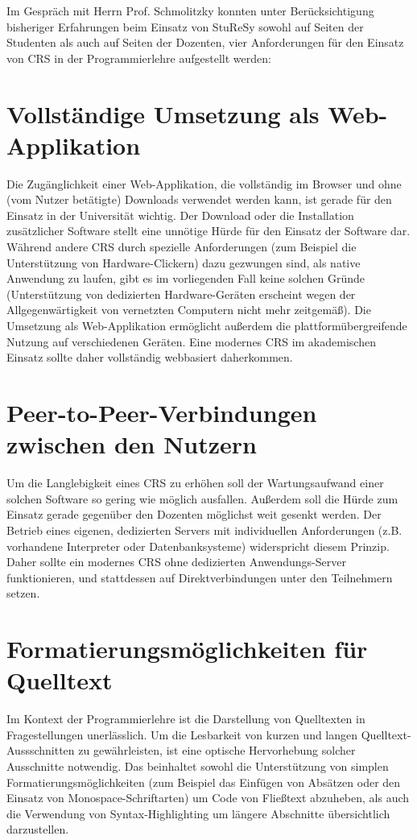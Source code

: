 Im Gespräch mit Herrn Prof. Schmolitzky konnten unter Berücksichtigung bisheriger Erfahrungen beim Einsatz von StuReSy sowohl auf Seiten der Studenten als auch auf Seiten der Dozenten, vier Anforderungen für den Einsatz von CRS in der Programmierlehre aufgestellt werden:

\section{Vollständige Umsetzung als Web-Applikation}
\label{chap:webbasiert}
Die Zugänglichkeit einer Web-Applikation, die vollständig im Browser und ohne (vom Nutzer betätigte) Downloads verwendet werden kann, ist gerade für den Einsatz in der Universität wichtig. Der Download oder die Installation zusätzlicher Software stellt eine unnötige Hürde für den Einsatz der Software dar. Während andere CRS durch spezielle Anforderungen (zum Beispiel die Unterstützung von Hardware-Clickern) dazu gezwungen sind, als native Anwendung zu laufen, gibt es im vorliegenden Fall keine solchen Gründe (Unterstützung von dedizierten Hardware-Geräten erscheint wegen der Allgegenwärtigkeit von vernetzten Computern nicht mehr zeitgemäß). Die Umsetzung als Web-Applikation ermöglicht außerdem die plattformübergreifende Nutzung auf verschiedenen Geräten. Eine modernes CRS im akademischen Einsatz sollte daher vollständig webbasiert daherkommen.

\section{Peer-to-Peer-Verbindungen zwischen den Nutzern}
\label{chap:anforderung_p2p}
Um die Langlebigkeit eines CRS zu erhöhen soll der Wartungsaufwand einer solchen Software so gering wie möglich ausfallen. Außerdem soll die Hürde zum Einsatz gerade gegenüber den Dozenten möglichst weit gesenkt werden. Der Betrieb eines eigenen, dedizierten Servers mit individuellen Anforderungen (z.B. vorhandene Interpreter oder Datenbanksysteme) widerspricht diesem Prinzip. Daher sollte ein modernes CRS ohne dedizierten Anwendungs-Server funktionieren, und stattdessen auf Direktverbindungen unter den Teilnehmern setzen.

\section{Formatierungsmöglichkeiten für Quelltext}
\label{chap:codeformatierung}
Im Kontext der Programmierlehre ist die Darstellung von Quelltexten in Fragestellungen unerlässlich. Um die Lesbarkeit von kurzen und langen Quelltext-Aussschnitten zu gewährleisten, ist eine optische Hervorhebung solcher Ausschnitte notwendig. 
Das beinhaltet sowohl die Unterstützung von simplen Formatierungsmöglichkeiten (zum Beispiel das Einfügen von Absätzen oder den Einsatz von Monospace-Schriftarten) um Code von Fließtext abzuheben, als auch die Verwendung von Syntax-Highlighting um längere Abschnitte übersichtlich darzustellen. 

